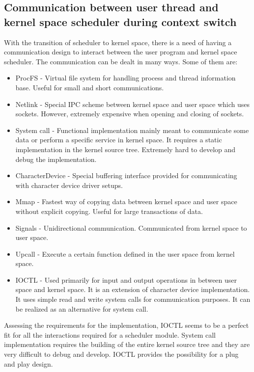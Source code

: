 \subsection{Communication between user thread and kernel space scheduler during context switch} 

With the transition of scheduler to kernel space, there is a need of having a communication design to interact between the user program and kernel space scheduler. 
The communication can be dealt in many ways\cite{commkernelanduser}. 
Some of them are:

\begin{itemize}
\item ProcFS - Virtual file system for handling process and thread information base. Useful for small and short communications. 
\item Netlink - Special IPC scheme between kernel space and user space which uses sockets. However, extremely expensive when opening and closing of sockets.
\item System call - Functional implementation mainly meant to communicate some data or perform a specific service in kernel space. It requires a static implementation in the kernel source tree. Extremely hard to develop and debug the implementation.
\item CharacterDevice - Special buffering interface provided for communicating with character device driver setups.
\item Mmap - Fastest way of copying data between kernel space and user space without explicit copying. Useful for large transactions of data.
\item Signals - Unidirectional communication. Communicated from kernel space to user space. 
\item Upcall - Execute a certain function defined in the user space from kernel space.
\item IOCTL - Used primarily for input and output operations in between user space and kernel space. It is an extension of character device implementation. It uses simple read and write system calls for communication purposes. It can be realized as an alternative for system call.

\end{itemize}


Assessing the requirements for the implementation, IOCTL seems to be a perfect fit for all the interactions required for a scheduler module. 
System call implementation requires the building of the entire kernel source tree and they are very difficult to debug and develop. 
IOCTL provides the possibility for a plug and play design.

